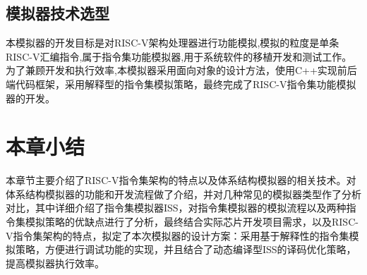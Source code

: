 \subsection{模拟器技术选型}
本模拟器的开发目标是对RISC-V架构处理器进行功能模拟,模拟的粒度是单条RISC-V汇编指令,属于指令集功能模拟器,用于系统软件的移植开发和测试工作。为了兼顾开发和执行效率,本模拟器采用面向对象的设计方法，使用C++实现前后端代码框架，采用解释型的指令集模拟策略，最终完成了RISC-V指令集功能模拟器的开发。


\section{本章小结}
本章节主要介绍了RISC-V指令集架构的特点以及体系结构模拟器的相关技术。对体系结构模拟器的功能和开发流程做了介绍，并对几种常见的模拟器类型作了分析对比，其中详细介绍了指令集模拟器ISS，对指令集模拟器的模拟流程以及两种指令集模拟策略的优缺点进行了分析，最终结合实际芯片开发项目需求，以及RISC-V指令集架构的特点，拟定了本次模拟器的设计方案：采用基于解释性的指令集模拟策略，方便进行调试功能的实现，并且结合了动态编译型ISS的译码优化策略，提高模拟器执行效率。